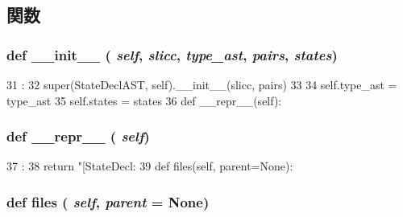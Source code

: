\subsection{関数}
\hypertarget{classslicc_1_1ast_1_1StateDeclAST_1_1StateDeclAST_ac775ee34451fdfa742b318538164070e}{
\subsubsection[{\_\-\_\-init\_\-\_\-}]{\setlength{\rightskip}{0pt plus 5cm}def \_\-\_\-init\_\-\_\- ( {\em self}, \/   {\em slicc}, \/   {\em type\_\-ast}, \/   {\em pairs}, \/   {\em states})}}
\label{classslicc_1_1ast_1_1StateDeclAST_1_1StateDeclAST_ac775ee34451fdfa742b318538164070e}



\begin{DoxyCode}
31                                                       :
32         super(StateDeclAST, self).__init__(slicc, pairs)
33 
34         self.type_ast = type_ast
35         self.states = states
36 
    def __repr__(self):
\end{DoxyCode}
\hypertarget{classslicc_1_1ast_1_1StateDeclAST_1_1StateDeclAST_ad8b9328939df072e4740cd9a63189744}{
\subsubsection[{\_\-\_\-repr\_\-\_\-}]{\setlength{\rightskip}{0pt plus 5cm}def \_\-\_\-repr\_\-\_\- ( {\em self})}}
\label{classslicc_1_1ast_1_1StateDeclAST_1_1StateDeclAST_ad8b9328939df072e4740cd9a63189744}



\begin{DoxyCode}
37                       :
38         return "[StateDecl: %
39 
    def files(self, parent=None):
\end{DoxyCode}
\hypertarget{classslicc_1_1ast_1_1StateDeclAST_1_1StateDeclAST_a35b1a87f6fcbddeb5b793b0e415765f8}{
\subsubsection[{files}]{\setlength{\rightskip}{0pt plus 5cm}def files ( {\em self}, \/   {\em parent} = {\ttfamily None})}}
\label{classslicc_1_1ast_1_1StateDeclAST_1_1StateDeclAST_a35b1a87f6fcbddeb5b793b0e415765f8}



